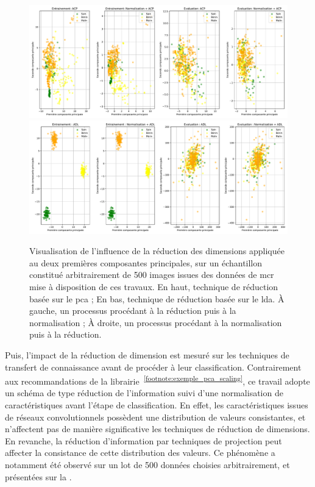 \begin{figure}[H]
    \centering
    \includegraphics[width=\linewidth]{contents/chapter_5/resources/visualisation_scaling_PCA.pdf}
    \includegraphics[width=\linewidth]{contents/chapter_5/resources/visualisation_scaling_LDA.pdf}
    \caption{Visualisation de l'influence de la réduction des dimensions appliquée au deux premières composantes principales, sur un échantillon constitué arbitrairement de 500 images issues des données de \gls{mcr} mise à disposition de ces travaux. En haut, technique de réduction basée sur le \gls{pca} ; En bas, technique de réduction basée sur le \gls{lda}. À gauche, un processus procédant à la réduction puis à la normalisation ; À droite, un processus procédant à la normalisation puis à la réduction.}
    \label{fig:visualisation_scaling_reduction}
\end{figure}\par

Puis, l'impact de la réduction de dimension est mesuré sur les techniques de transfert de connaissance avant de procéder à leur classification. Contrairement aux recommandations de la librairie~\textsuperscript{\ref{footnote:exemple_pca_scaling}}, ce travail adopte un schéma de type réduction de l'information suivi d'une normalisation de caractéristiques avant l'étape de classification. En effet, les caractéristiques issues de réseaux convolutionnels possèdent une distribution de valeurs consistantes, et n'affectent pas de manière significative les techniques de réduction de dimensions. En revanche, la réduction d'information par techniques de projection peut affecter la consistance de cette distribution des valeurs. Ce phénomène a notamment été observé sur un lot de 500 données choisies arbitrairement, et présentées sur la .\par

